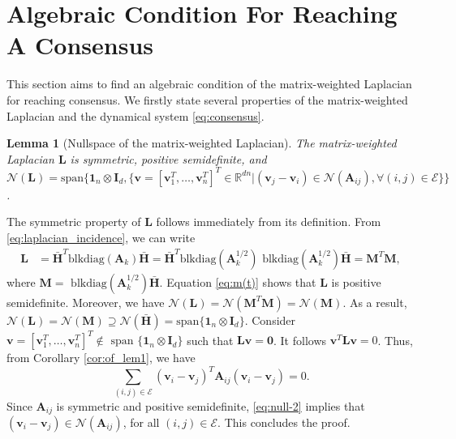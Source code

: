 \documentclass[draftclsnofoot,11pt,onecolumn]{IEEEtran}
\newtheorem{Lemma}{Lemma}
\newtheorem{Problem}{Problem}
\newcommand{\m}[1]{\mathbf{#1}}
\newcommand{\mc}[1]{\mathcal{#1}}
\newcommand{\mb}[1]{\mathbb{#1}}
\begin{document}

\section{Algebraic Condition For Reaching A Consensus}
\label{sec:3}
This section aims to find an algebraic condition of the matrix-weighted Laplacian for reaching consensus. We firstly state several  properties of the matrix-weighted Laplacian and the dynamical system \eqref{eq:consensus}.

\begin{Lemma}[Nullspace of the matrix-weighted Laplacian] \label{lem:laplacian}
The matrix-weighted Laplacian $\m{L}$ is symmetric, positive semidefinite, and $\mc{N}(\m{L}) = \text{span}\{ \m{1}_n \otimes \m{I}_{d}, \{\m{v} = [\m{v}_1^T, \ldots, \m{v}_n^T]^T \in \mb{R}^{dn}| (\m{v}_j - \m{v}_i) \in \mc{N}(\m{A}_{ij}), \forall (i,j) \in \mc{E} \} \}$.
\end{Lemma}
\begin{IEEEproof} The symmetric property of $\m{L}$ follows immediately from its definition. From \eqref{eq:laplacian_incidence}, we can write
\begin{align} \label{eq:m(t)}
\m{L} &= \bar{\m{H}}^T \text{blkdiag} (\m{A}_k) \bar{\m{H}} = \bar{\m{H}}^T \text{blkdiag} (\m{A}_k^{1/2}) \text{ blkdiag} (\m{A}_k^{1/2}) \bar{\m{H}}  = \m{M}^T\m{M}, 
\end{align}
where $\m{M} = \text{ blkdiag} (\m{A}_k^{1/2}) \bar{\m{H}}$. Equation \eqref{eq:m(t)} shows that $\m{L}$ is positive semidefinite. Moreover, we have $\mc{N}(\m{L}) = \mc{N}(\m{M}^T\m{M})=\mc{N}(\m{M})$. As a result, $\mc{N}(\m{L}) = \mathcal{N}{(\m{M})} \supseteq \mathcal{N}(\bar{\m{H}}) = \text{span} \{ \m{1}_n \otimes \m{I}_{d} \}$. Consider $\m{v} = [\m{v}_1^T, \ldots, \m{v}_n^T]^T \notin \text{ span }\{ \m{1}_n \otimes \m{I}_{d}\}$ such that $\m{L} \m{v} = \m{0} $. It follows $\m{v}^T\m{L} \m{v} = 0$. Thus, from Corollary \ref{cor:of_lem1}, we have 
\begin{equation} \label{eq:null-2}
\sum_{(i,j) \in \mc{E}} (\m{v}_i - \m{v}_j)^T \m{A}_{ij} (\m{v}_i - \m{v}_j) = 0.
\end{equation}
Since $\m{A}_{ij}$ is symmetric and positive semidefinite, \eqref{eq:null-2} implies that $(\m{v}_i - \m{v}_j) \in \mc{N}(\m{A}_{ij})$, for all $(i,j) \in \mc{E}$. This concludes the proof.
\end{IEEEproof}
\end{document}
